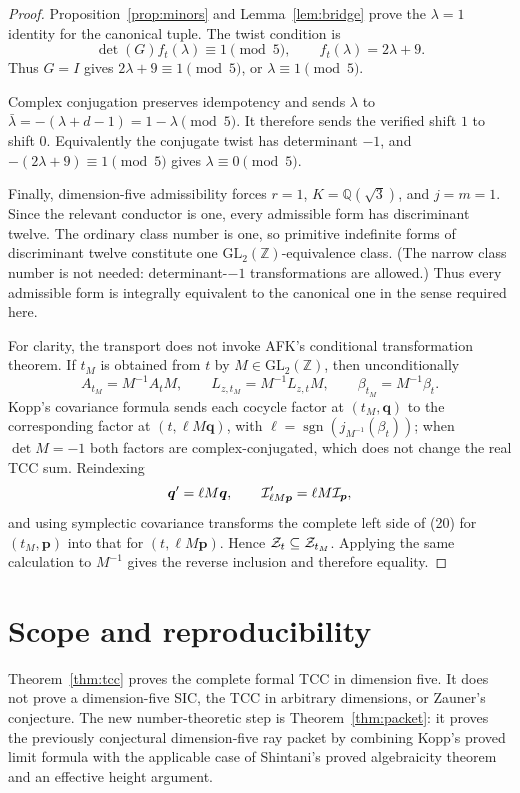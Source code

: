 \documentclass[11pt]{article}
\newcommand{\Q}{\mathbb Q}
\newcommand{\Z}{\mathbb Z}
\begin{document}
\begin{proof}
Proposition~\ref{prop:minors} and Lemma~\ref{lem:bridge} prove the
$\lambda=1$ identity for the canonical tuple.  The twist condition is
\[
 \det(G)f_t(\lambda)\equiv1\pmod5,\qquad
 f_t(\lambda)=2\lambda+9.
\]
Thus $G=I$ gives $2\lambda+9\equiv1\pmod5$, or
$\lambda\equiv1\pmod5$.

Complex conjugation preserves idempotency and sends
$\lambda$ to
$\bar\lambda=-(\lambda+d-1)=1-\lambda\pmod5$.
It therefore sends the verified shift $1$ to shift $0$.
Equivalently the conjugate twist has determinant $-1$, and
$-(2\lambda+9)\equiv1\pmod5$ gives $\lambda\equiv0\pmod5$.

Finally, dimension-five admissibility forces $r=1$,
$K=\Q(\sqrt3)$, and $j=m=1$.  Since the relevant conductor is one,
every admissible form has discriminant twelve.  The ordinary class
number is one, so primitive indefinite forms of discriminant twelve
constitute one $\mathrm{GL}_2(\Z)$-equivalence class.  (The narrow class
number is not needed: determinant-$-1$ transformations are allowed.)
Thus every admissible form is integrally equivalent to the canonical
one in the sense required here.

For clarity, the transport does not invoke AFK's conditional
transformation theorem.  If $t_M$ is obtained from $t$ by
$M\in\mathrm{GL}_2(\Z)$, then unconditionally
\[
 A_{t_M}=M^{-1}A_tM,\qquad
 L_{z,t_M}=M^{-1}L_{z,t}M,\qquad
 \beta_{t_M}=M^{-1}\beta_t.
\]
Kopp's covariance formula sends each cocycle factor at
$(t_M,\boldsymbol q)$ to the corresponding factor at
$(t,\ell M\boldsymbol q)$, with
$\ell=\operatorname{sgn}(j_{M^{-1}}(\beta_t))$; when
$\det M=-1$ both factors are complex-conjugated, which does not change
the real TCC sum.  Reindexing
\[
 \boldsymbol q'=\ell M\boldsymbol q,\qquad
 {\cal I}'_{\ell M\boldsymbol p}=\ell M{\cal I}_{\boldsymbol p},
\]
and using symplectic covariance transforms the complete left side of
(20) for $(t_M,\boldsymbol p)$ into that for
$(t,\ell M\boldsymbol p)$.  Hence
${\cal Z}_t\subseteq{\cal Z}_{t_M}$.  Applying the same calculation to
$M^{-1}$ gives the reverse inclusion and therefore equality.
\end{proof}

\section{Scope and reproducibility}

Theorem~\ref{thm:tcc} proves the complete formal TCC in dimension five.
It does not prove a dimension-five SIC, the TCC in arbitrary
dimensions, or Zauner's conjecture.  The new number-theoretic step is
Theorem~\ref{thm:packet}: it proves the previously conjectural
dimension-five ray packet by combining Kopp's proved limit formula with
the applicable case of Shintani's proved algebraicity theorem and an
effective height argument.
\end{document}
